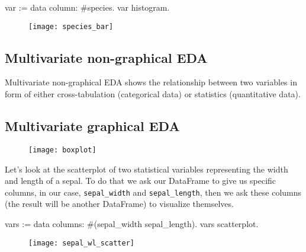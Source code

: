 \documentclass{article}
\begin{document}
\begin{multicols}{2}
\begin{code}{}
var := data column: #species.
var histogram.
\end{code}

\begin{figure}[H]
  \begin{center}
  \texttt{[image: species\_bar]}
  \end{center}
\end{figure}

\subsection{Multivariate non-graphical EDA}
Multivariate non-graphical EDA shows the relationship between two variables in form of either cross-tabulation (categorical data) or statistics (quantitative data).

\subsection{Multivariate graphical EDA}
\begin{figure}[H]
  \begin{center}
  \texttt{[image: boxplot]}
  \end{center}
\end{figure}

Let's look at the scatterplot of two statistical variables representing the width and length of a sepal. To do that we ask our DataFrame to give us specific columns, in our case, \texttt{sepal\_width} and \texttt{sepal\_length}, then we ask these columns (the result will be another DataFrame) to visualize themselves.

\begin{code}{}
vars := data columns: #(sepal_width sepal_length).
vars scatterplot.
\end{code}

\begin{figure}[H]
  \begin{center}
  \texttt{[image: sepal\_wl\_scatter]}
  \end{center}
\end{figure}

%
%



\end{multicols}
\end{document}
